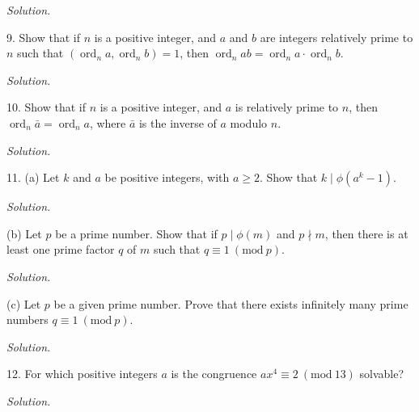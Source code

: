 \documentclass{article}
\newcommand{\Mod}[1]{\ (\mathrm{mod}\ #1)}
\DeclareMathOperator{\ord}{ord}
\begin{document}
\textit{Solution.}

\newpage

9. Show that if $n$ is a positive integer, and $a$ and $b$ are integers
relatively prime to $n$ such that $(\ord_n a, \ord_n b) = 1$, then
$\ord_n ab = \ord_n a \cdot \ord_n b$.

\textit{Solution.}

\newpage

10. Show that if $n$ is a positive integer, and $a$ is relatively prime
to $n$, then $\ord_n \bar{a} = \ord_n a$, where $\bar{a}$ is the inverse
of $a$ modulo $n$.

\textit{Solution.}

\newpage

11. (a) Let $k$ and $a$ be positive integers, with $a \geq 2$. Show
that $k \mid \phi(a^k - 1)$.

\textit{Solution.}

\vspace{5mm}

(b) Let $p$ be a prime number. Show that if $p \mid \phi(m)$ and
$p \nmid m$, then there is at least one prime factor $q$ of $m$
such that $q \equiv 1 \Mod{p}$.

\textit{Solution.}

\vspace{5mm}

(c) Let $p$ be a given prime number. Prove that there exists infinitely
many prime numbers $q \equiv 1 \Mod{p}$.

\textit{Solution.}

\newpage

12. For which positive integers $a$ is the congruence
$a x^4 \equiv 2 \Mod{13}$ solvable?

\textit{Solution.}
\end{document}
